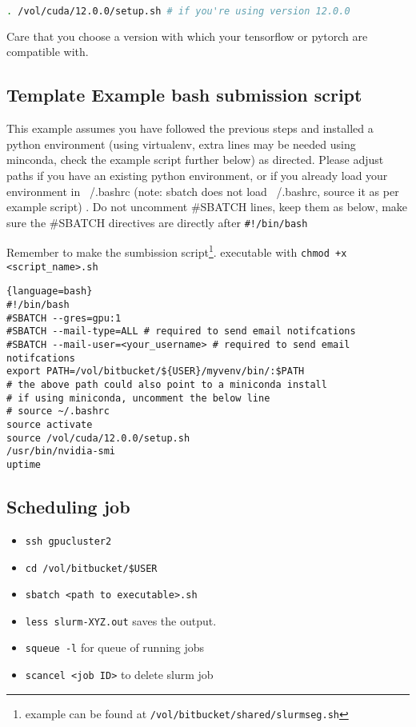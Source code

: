 \documentclass[11pt]{article}
\begin{document}
\begin{lstlisting}[language=sh]
    . /vol/cuda/12.0.0/setup.sh # if you're using version 12.0.0
\end{lstlisting}

Care that you choose a version with which your tensorflow or pytorch are compatible with.

\subsection{Template Example bash submission script}

\begin{warning}
    This example assumes you have followed the previous steps and installed a python environment (using virtualenv, extra lines may  be needed using minconda, check the example script further below) as directed. Please adjust paths if you have an existing python environment, or if you already load your environment in ~/.bashrc (note: sbatch does not load ~/.bashrc, source it as per example script) . Do not uncomment \#SBATCH lines, keep them as below, make sure the \#SBATCH directives are directly after \verb|#!/bin/bash|
\end{warning}

Remember to make the sumbission script\footnote{example can be found at \texttt{/vol/bitbucket/shared/slurmseg.sh}}. executable with \verb|chmod +x <script_name>.sh|

\begin{lstlisting}{language=bash}
#!/bin/bash
#SBATCH --gres=gpu:1
#SBATCH --mail-type=ALL # required to send email notifcations
#SBATCH --mail-user=<your_username> # required to send email notifcations
export PATH=/vol/bitbucket/${USER}/myvenv/bin/:$PATH
# the above path could also point to a miniconda install
# if using miniconda, uncomment the below line
# source ~/.bashrc
source activate
source /vol/cuda/12.0.0/setup.sh
/usr/bin/nvidia-smi
uptime
\end{lstlisting}

\subsection{Scheduling job}

\begin{itemize}
    \item \texttt{ssh gpucluster2}
    \item \texttt{cd /vol/bitbucket/\$USER}
    \item \texttt{sbatch <path to executable>.sh}
    \item \texttt{less slurm-XYZ.out} saves the output.
    \item \verb|squeue -l| for queue of running jobs
    \item \verb|scancel <job ID>| to delete slurm job
\end{itemize}
\end{document}
